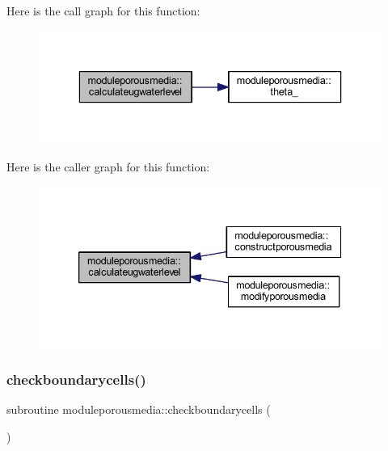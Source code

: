 Here is the call graph for this function\+:\nopagebreak
\begin{figure}[H]
\begin{center}
\leavevmode
\includegraphics[width=336pt]{namespacemoduleporousmedia_a3ba8c32bae3dfce05b772d49374e1381_cgraph}
\end{center}
\end{figure}
Here is the caller graph for this function\+:\nopagebreak
\begin{figure}[H]
\begin{center}
\leavevmode
\includegraphics[width=339pt]{namespacemoduleporousmedia_a3ba8c32bae3dfce05b772d49374e1381_icgraph}
\end{center}
\end{figure}
\mbox{\label{namespacemoduleporousmedia_a2dddd8490c583823d5dd45c3bb20e816}} 
\subsubsection{\texorpdfstring{checkboundarycells()}{checkboundarycells()}}
{\footnotesize\ttfamily subroutine moduleporousmedia\+::checkboundarycells (\begin{DoxyParamCaption}{ }\end{DoxyParamCaption})\hspace{0.3cm}{\ttfamily [private]}}

